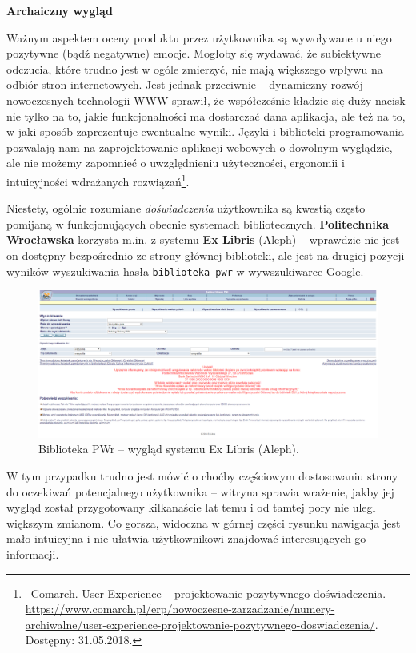 \documentclass[12pt, a4paper]{article}
\begin{document}
\noindent\textbf{Archaiczny wygląd}\\\vspace{-0.35cm}

Ważnym aspektem oceny produktu przez użytkownika są wywoływane u niego pozytywne (bądź negatywne) emocje. Mogłoby się wydawać, że subiektywne odczucia, które trudno jest w ogóle zmierzyć, nie mają większego wpływu na odbiór stron internetowych. Jest jednak przeciwnie -- dynamiczny rozwój nowoczesnych technologii WWW sprawił, że współcześnie kładzie się duży nacisk nie tylko na to, jakie funkcjonalności ma dostarczać dana aplikacja, ale też na to, w jaki sposób zaprezentuje ewentualne wyniki. Języki i biblioteki programowania pozwalają nam na zaprojektowanie aplikacji webowych o dowolnym wyglądzie, ale nie możemy zapomnieć o uwzględnieniu użyteczności, ergonomii i intuicyjności wdrażanych rozwiązań\footnote{\ Comarch. User Experience -- projektowanie pozytywnego doświadczenia.\\\url{https://www.comarch.pl/erp/nowoczesne-zarzadzanie/numery-archiwalne/user-experience-projektowanie-pozytywnego-doswiadczenia/}. Dostępny: 31.05.2018.}. 

Niestety, ogólnie rozumiane \textit{doświadczenia} użytkownika są kwestią często pomijaną w funkcjonujących obecnie systemach bibliotecznych. \textbf{Politechnika Wrocławska} korzysta m.in. z systemu \textbf{Ex Libris} (Aleph) -- wprawdzie nie jest on dostępny bezpośrednio ze strony głównej biblioteki, ale jest na drugiej pozycji wyników wyszukiwania hasła \texttt{biblioteka pwr} w wywszukiwarce Google.

\begin{figure}[h]
    \includegraphics[width=\textwidth]{aleph.png}
    \caption{Biblioteka PWr -- wygląd systemu Ex Libris (Aleph).}
\end{figure}

W tym przypadku trudno jest mówić o choćby częściowym dostosowaniu strony do oczekiwań potencjalnego użytkownika -- witryna sprawia wrażenie, jakby jej wygląd został przygotowany kilkanaście lat temu i od tamtej pory nie ulegl większym zmianom. Co gorsza, widoczna w górnej części rysunku nawigacja jest mało intuicyjna i nie ułatwia użytkownikowi znajdować interesujących go informacji.\\
\end{document}
